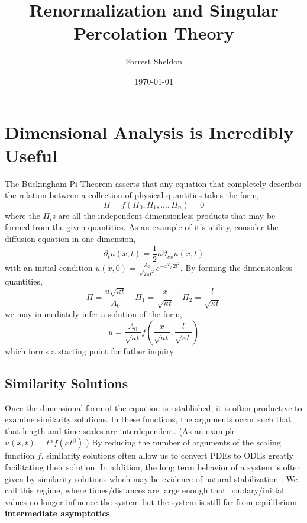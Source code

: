 
\title{Renormalization and Singular Percolation Theory}
\author{Forrest Sheldon}
\date{\today}

\maketitle

\section{Dimensional Analysis is Incredibly Useful}

The Buckingham Pi Theorem \cite{Buckingham1914} asserts that any equation
that completely describes
the relation between a collection of physical quantities takes the form,
\[\Pi = f( \Pi_0, \Pi_1, ...,\Pi_n) = 0\]
where the $\Pi_i$s are all the independent dimensionless products that may be
formed from the given quantities.  As an example of it's utility, consider the
diffusion equation in one dimension,
\[\partial_t u(x, t) = \frac{1}{2} \kappa \partial_{xx} u(x, t)\]
with an initial condition $u(x, 0) = \frac{A_0}{\sqrt{2\pi l^2}} e^{-x^2 / 2l^2}$.
By forming the dimensionless quantities,
\[\Pi = \frac{u \sqrt{\kappa t}}{A_0}\quad \Pi_1 = \frac{x}{\sqrt{\kappa t}} \quad
\Pi_2 = \frac{l}{\sqrt{\kappa t}} \]
we may immediately infer a solution of the form,
\[u  = \frac{A_0}{\sqrt{\kappa t}} f\left(\frac{x}{\sqrt{\kappa t}}, \frac{l}{\sqrt{\kappa t}}\right) \]
which forms a starting point for futher inquiry.

\subsection{Similarity Solutions}
Once the dimensional form of the equation is established, it is often productive to
examine similarity solutions.  In these functions, the arguments occur such that that length
and time scales are interdependent. (As an example $u(x, t) = t^\alpha f(x t^\beta).$)
By reducing the number of arguments of the scaling function $f$, similarity solutions
often allow us to convert PDEs to ODEs greatly facilitating their solution.  In addition,
the long term behavior of a system is often given by similarity solutions which may be
evidence of natural stabilization \cite{Barrenblatt1996}.  We call this regime, where
times/distances are large enough that boudary/initial values no longer influence the system
but the system is still far from equilibrium \textbf{intermediate asymptotics}.

